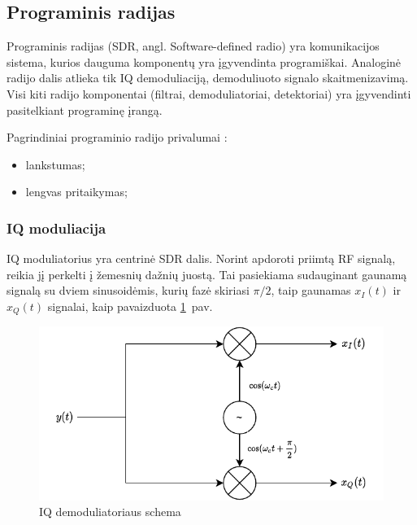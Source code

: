 \documentclass[main.tex]{subfiles}
\begin{document}
\subsection{Programinis radijas}

Programinis radijas (SDR, angl. Software-defined radio) yra komunikacijos sistema,
kurios dauguma komponentų yra įgyvendinta programiškai. Analoginė radijo dalis
atlieka tik IQ demoduliaciją, demoduliuoto signalo skaitmenizavimą.
Visi kiti radijo komponentai (filtrai, demoduliatoriai, detektoriai) yra įgyvendinti
pasitelkiant programinę įrangą.

Pagrindiniai programinio radijo privalumai \cite{Sadiku-2004}:
\begin{itemize}
    \item lankstumas;
    \item lengvas pritaikymas;
\end{itemize}

\subsubsection{IQ moduliacija}

IQ moduliatorius yra centrinė SDR dalis. Norint apdoroti priimtą RF signalą, reikia
jį perkelti į žemesnių dažnių juostą. Tai pasiekiama sudauginant gaunamą signalą su dviem
sinusoidėmis, kurių fazė skiriasi $\pi/2$, taip gaunamas $x_I(t)$ ir $x_Q(t)$ signalai,
kaip pavaizduota \ref{fig:iq_modulator}~pav.

\begin{figure}[h]
    \begin{centering}
    \includegraphics[scale=1.0]{drawings/iq_modulator}
    \par\end{centering}
    \protect\caption{\label{fig:iq_modulator}IQ demoduliatoriaus schema}
\end{figure}
\end{document}
